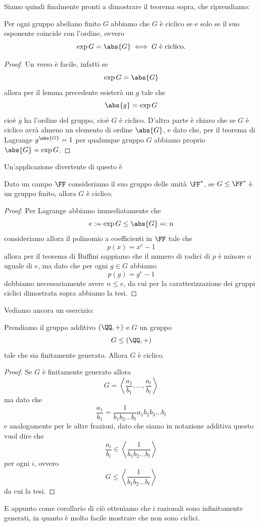 \documentclass[11pt]{scrartcl}
\begin{document}
	Siamo quindi finalmente pronti a dimostrare il teorema sopra, che riprendiamo:
	\begin{theorem}
		Per ogni gruppo abeliano finito $G$ abbiamo che $G$ è ciclico se e solo se il suo esponente coincide con l'ordine, ovvero
		$$\exp G = \abs{G} \iff G \text{ è ciclico}.$$
	\end{theorem}
	\begin{proof}
		Un verso è facile, infatti se 
		$$\exp G = \abs{G}$$
		allora per il lemma precedente esisterà un $g$ tale che 
		$$\abs{g}=\exp G$$
		cioè $g$ ha l'ordine del gruppo, cioè $G$ è ciclico. D'altra parte è chiaro che se $G$ è ciclico avrà almeno un elemento di ordine $\abs{G}$, e dato che, per il teorema di Lagrange $g^{\abs{G}}=1$ per qualunque gruppo $G$ abbiamo proprio $\abs{G}=\exp G$.
	\end{proof}
	Un'applicazione divertente di questo è
	\begin{theorem}
		Dato un campo $\FF$ consideriamo il suo gruppo delle unità $\FF^*$, se $G\le \FF^*$ è un gruppo finito, allora $G$ è ciclico.
	\end{theorem}
	\begin{proof}
		Per Lagrange abbiamo immediatamente che 
		$$e:=\exp G \le \abs{G}=:n$$
		consideriamo allora il polinomio a coefficienti in $\FF$ tale che
		$$p(x)=x^e-1$$
		allora per il teorema di Ruffini sappiamo che il numero di radici di $p$ è minore o uguale di $e$, ma dato che per ogni $g\in G$ abbiamo
		$$p(g)=g^e-1$$
		dobbiamo necessariamente avere $n\le e$, da cui per la caratterizzazione dei gruppi ciclici dimostrata sopra abbiamo la tesi.
	\end{proof}
	Vediamo ancora un esercizio:
	\begin{proposition}
		Prendiamo il gruppo additivo $(\QQ,+)$ e $G$ un gruppo 
		$$G\le \left(\QQ,+\right)$$
		tale che sia finitamente generato. Allora $G$ è ciclico.
	\end{proposition}
	\begin{proof}
		Se $G$ è finitamente generato allora
		$$G=\left\langle \frac{a_1}{b_1},\dots,\frac{a_t}{b_t} \right\rangle$$
		ma dato che
		$$\frac{a_1}{b_1}=\frac{1}{b_1b_2\dots b_t}a_1b_2b_3\dots b_t$$
		e analogamente per le altre frazioni, dato che siamo in notazione additiva questo vuol dire che
		$$\frac{a_i}{b_i}\in \left\langle \frac{1}{b_1b_2\dots b_t} \right\rangle$$
		per ogni $i$, ovvero
		$$G\le \left\langle \frac{1}{b_1b_2\dots b_t} \right\rangle$$
		da cui la tesi.
	\end{proof}
	E appunto come corollario di ciò otteniamo che i razionali sono infinitamente generati, in quanto è molto facile mostrare che non sono ciclici.
	
\end{document}
